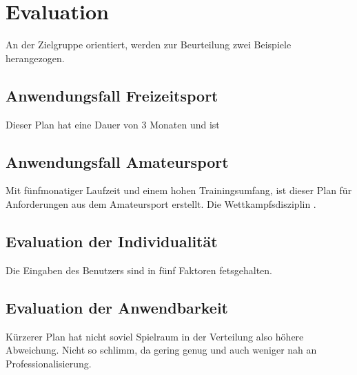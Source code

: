 \chapter{Evaluation}
\label{sec:evaluation}
An der Zielgruppe orientiert, werden zur Beurteilung zwei Beispiele herangezogen.
\section{Anwendungsfall Freizeitsport}
Dieser Plan hat eine Dauer von 3 Monaten und ist 
\section{Anwendungsfall Amateursport}
Mit fünfmonatiger Laufzeit und einem hohen Trainingsumfang, ist dieser Plan für Anforderungen aus dem Amateursport erstellt. Die Wettkampfsdisziplin .

\section{Evaluation der Individualität}
Die Eingaben des Benutzers sind in fünf Faktoren fetsgehalten. 

\section{Evaluation der Anwendbarkeit}
Kürzerer Plan hat nicht soviel Spielraum in der Verteilung also höhere Abweichung. Nicht so schlimm, da gering genug und auch weniger nah an Professionalisierung.
